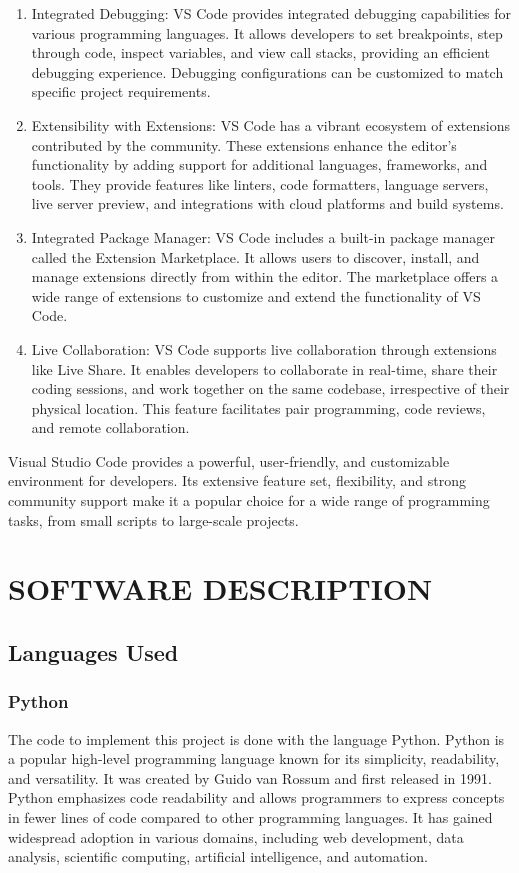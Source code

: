 \documentclass[12 pt, oneside]{book}
\begin{document}
\begin{enumerate}
\item Integrated Debugging: VS Code provides integrated debugging capabilities for various programming languages. It allows developers to set breakpoints, step through code, inspect variables, and view call stacks, providing an efficient debugging experience. Debugging configurations can be customized to match specific project requirements.

\item Extensibility with Extensions: VS Code has a vibrant ecosystem of extensions contributed by the community. These extensions enhance the editor's functionality by adding support for additional languages, frameworks, and tools. They provide features like linters, code formatters, language servers, live server preview, and integrations with cloud platforms and build systems.

\item Integrated Package Manager: VS Code includes a built-in package manager called the Extension Marketplace. It allows users to discover, install, and manage extensions directly from within the editor. The marketplace offers a wide range of extensions to customize and extend the functionality of VS Code.

\item  Live Collaboration: VS Code supports live collaboration through extensions like Live Share. It enables developers to collaborate in real-time, share their coding sessions, and work together on the same codebase, irrespective of their physical location. This feature facilitates pair programming, code reviews, and remote collaboration.
  
\end{enumerate}
Visual Studio Code provides a powerful, user-friendly, and customizable environment for developers. Its extensive feature set, flexibility, and strong community support make it a popular choice for a wide range of programming tasks, from small scripts to large-scale projects.

\chapter{SOFTWARE DESCRIPTION}
\section{Languages Used }

\subsection{Python}
The code to implement this project is done with the language Python.
Python is a popular high-level programming language known for its simplicity, readability, and versatility. It was created by Guido van Rossum and first released in 1991. Python emphasizes code readability and allows programmers to express concepts in fewer lines of code compared to other programming languages. It has gained widespread adoption in various domains, including web development, data analysis, scientific computing, artificial intelligence, and automation.
\end{document}
